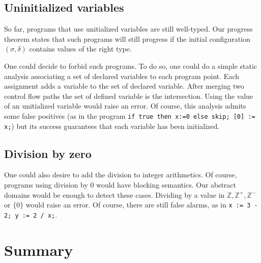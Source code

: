 \subsection*{Uninitialized variables}

So far, programs that use unitialized variables are still well-typed. Our progress theorem states that such programs will still progress if the initial configuration $(\sigma,\delta)$ contains values of the right type.

One could decide to forbid such programs. To do so, one could do a simple static analysis associating a set of declared variables to each program point. Each assignment adds a variable to the set of declared variable. After merging two control flow paths the set of defined variable is the intersection. Using the value of an unitialized variable would raise an error. Of course, this analysis admits some false positives (as in the program \texttt{if true then x:=0 else skip; [0] := x;}) but its success guarantees that each variable has been initialized. 

\subsection*{Division by zero}

One could also desire to add the division to integer arithmetics. Of course, programs using division by 0 would have blocking semantics. Our abstract domains would be enough to detect these cases. Dividing by a value in $\mathbb{Z}, \mathbb{Z^+}, \mathbb{Z^-}$ or $\lbrace 0 \rbrace$ would raise an error. Of course, there are still false alarms, as in \texttt{x := 3 - 2; y := 2 / x;}.


\section*{Summary}
  \begin{center}
  \end{center}

